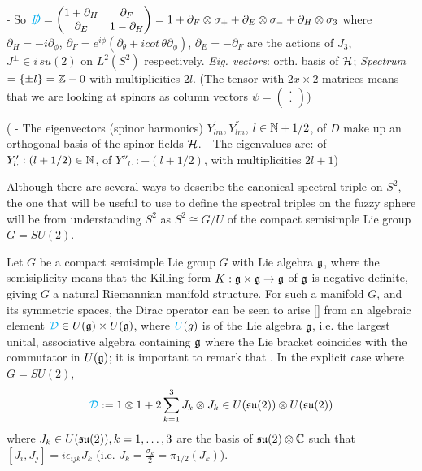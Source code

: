 - So $\textcolor{cyan}{\slashed D} = \begin{pmatrix} 1 + \partial_H & \partial_F \\ \partial_E & 1 - \partial_H\end{pmatrix} = 1 + \partial_F \otimes \sigma_+ + \partial_E \otimes \sigma_- + \partial_H \otimes \sigma_3$ where $\partial_H = -i \partial_\phi$, $\partial_F = e^{i\phi} \left( \partial_\theta + i cot\,\theta \partial_\phi \right)$, $\partial_E = -\partial_F%
$ are the actions of $J_3$, $J^\pm \in i\,su(2)$ on $L^2(S^2)$ respectively. \textit{Eig. vectors}: orth. basis of $\mathcal H$; \textit{Spectrum} $= \{\pm l\} = \mathbb{Z} - 0$ with multiplicities $2l$. (The tensor with $2x\times 2$ matrices means that we are looking at spinors as column vectors $\psi = \begin{pmatrix} \cdot \\ \cdot \end{pmatrix}$)%

( - The eigenvectors (spinor harmonics) $Y^{'}_{lm}, Y^{''}_{lm}$, $l \in \mathbb{N} + 1/2$, of $D$ make up an orthogonal basis of the spinor fields $\mathcal H$.
 - The eigenvalues are: of $Y'_{l\cdot}: (l + 1/2) \in \mathbb{N}$, of $Y{''}_{l\cdot}: -(l + 1/2)$, with multiplicities $2l+1$)

\linea

Although there are several ways to describe the canonical spectral triple on  $S^2$, the one that will be useful to use to define the spectral triples on the fuzzy sphere will be from understanding $S^2$ as  $S^2 \cong G/U$ of the compact semisimple Lie group $G = SU(2)$.

Let $G$ be a compact semisimple Lie group $G$ with Lie algebra $\mathfrak{g}$, where the semisiplicity means that the Killing form $K: \mathfrak{g} \times \mathfrak{g} \to \mathfrak{g}$ of $\mathfrak{g}$ is negative definite, giving $G$ a natural Riemannian manifold structure. For such a manifold $G$, and its symmetric spaces, the Dirac operator can be seen to arise \ref{} from an algebraic element $\textcolor{cyan}{\mathcal D } \in U(\mathfrak{g})\times U(\mathfrak{g})$, where $\textcolor{cyan}{U}(g)$ is  of the Lie algebra $\mathfrak{g}$, i.e. the largest  unital, associative algebra containing $\mathfrak{g}$ where the Lie bracket coincides with the commutator in $U(\mathfrak{g})$; it is important to remark that . In the explicit case where $G = SU(2)$,
\begin{equation}
    \textcolor{cyan}{\mathcal D} := 1 \otimes 1 + 2 \sum_{k = 1}^3 J_k \otimes J_k \in U(\mathfrak{su}(2)) \otimes U(\mathfrak{su}(2))
\end{equation}
where $J_k \in U(\mathfrak{su}(2)), k = 1, \dots, 3$ are the basis of $\mathfrak{su}(2)\otimes \mathbb{C}$ such that $[J_i, J_j] = i \epsilon_{ijk} J_k$ (i.e. $J_k = \frac{\sigma_k}{2} = \pi_{1/2}(J_k)$). 

